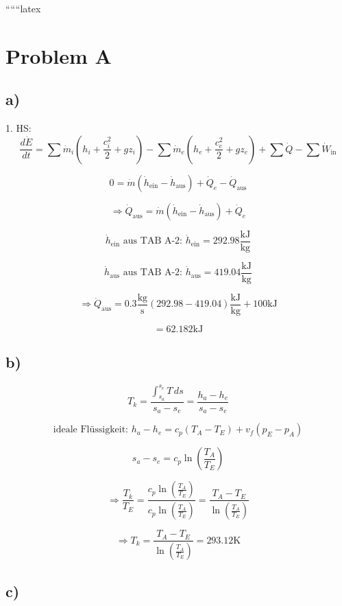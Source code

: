 
``````latex


\section*{Problem A}

\subsection*{a)}

1. HS:
\[
\frac{d\dot{E}}{dt} = \sum \dot{m}_i \left( h_i + \frac{c_i^2}{2} + g z_i \right) - \sum \dot{m}_e \left( h_e + \frac{c_e^2}{2} + g z_e \right) + \sum \dot{Q} - \sum \dot{W}_{\text{in}}
\]

\[
0 = \dot{m} (\dot{h}_{\text{ein}} - \dot{h}_{\text{aus}}) + \dot{Q}_e - \dot{Q}_{\text{aus}}
\]

\[
\Rightarrow \dot{Q}_{\text{aus}} = \dot{m} (\dot{h}_{\text{ein}} - \dot{h}_{\text{aus}}) + \dot{Q}_e
\]

\[
\dot{h}_{\text{ein}} \text{ aus TAB A-2: } \dot{h}_{\text{ein}} = 292.98 \frac{\text{kJ}}{\text{kg}}
\]

\[
\dot{h}_{\text{aus}} \text{ aus TAB A-2: } \dot{h}_{\text{aus}} = 419.04 \frac{\text{kJ}}{\text{kg}}
\]

\[
\Rightarrow \dot{Q}_{\text{aus}} = 0.3 \frac{\text{kg}}{\text{s}} \left( 292.98 - 419.04 \right) \frac{\text{kJ}}{\text{kg}} + 100 \text{kJ}
\]

\[
= 62.182 \text{kJ}
\]

\subsection*{b)}

\[
T_k = \frac{\int_{s_a}^{s_e} T \, ds}{s_a - s_e} = \frac{h_a - h_e}{s_a - s_e}
\]

\[
\text{ideale Flüssigkeit: } h_a - h_e = c_p (T_A - T_E) + v_f (p_E - p_A)
\]

\[
s_a - s_e = c_p \ln \left( \frac{T_A}{T_E} \right)
\]

\[
\Rightarrow \frac{T_k}{T_E} = \frac{c_p \ln \left( \frac{T_A}{T_E} \right)}{c_p \ln \left( \frac{T_A}{T_E} \right)} = \frac{T_A - T_E}{\ln \left( \frac{T_A}{T_E} \right)}
\]

\[
\Rightarrow T_k = \frac{T_A - T_E}{\ln \left( \frac{T_A}{T_E} \right)} = 293.12 \text{K}
\]

\subsection*{c)}


